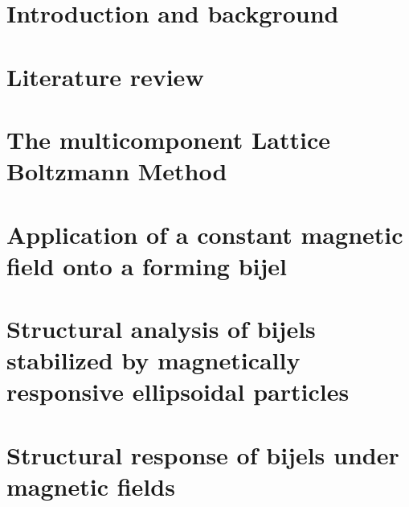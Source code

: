 \documentclass{udthesis}
\begin{document}


% 

% 

\chapter{Introduction and background}
\label{chapter:introduction}


\chapter{Literature review}
\label{chapter:lit_review}


\chapter{The multicomponent Lattice Boltzmann Method}
\label{chapter:methods_chapter}


% 

\chapter{Application of a constant magnetic field onto a forming bijel}
\label{chapter:aim1}


\chapter{Structural analysis of bijels stabilized by magnetically responsive ellipsoidal particles}
\label{chapter:aim1_5}


\chapter{Structural response of bijels under magnetic fields}
\label{chapter:aim2}

\end{document}
